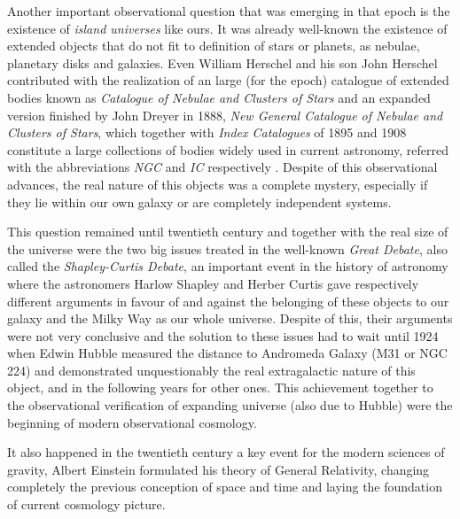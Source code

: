 Another important observational question that was emerging in that epoch 
is the existence of \textit{island universes} like ours. It was already 
well-known the existence of extended objects that do not fit to definition 
of stars or planets, as nebulae, planetary disks and galaxies. Even William
Herschel and his son John Herschel contributed with the realization of an
large (for the epoch) catalogue of extended bodies known as 
\textit{Catalogue of Nebulae and Clusters of Stars} and an expanded version
finished by John Dreyer in 1888, \textit{New General Catalogue of 
Nebulae and Clusters of Stars}, which together with \textit{Index Catalogues}
of 1895 and 1908 constitute a large collections of bodies widely used in 
current astronomy, referred with the abbreviations \textit{NGC} and 
\textit{IC} respectively \cite{longair2008}. Despite of this observational
advances, the real nature of this objects was a complete mystery, especially 
if they lie within our own galaxy or are completely independent systems. 



This question remained until twentieth century and together with the real 
size of the universe were the two big issues treated in the well-known 
\textit{Great Debate}, also called the \textit{Shapley-Curtis Debate}, an
important event in the history of astronomy where the astronomers Harlow 
Shapley and Herber Curtis gave respectively different arguments in favour 
of and against the belonging of these objects to our galaxy and the Milky 
Way as our whole universe. Despite of this, their arguments were not very
conclusive and the solution to these issues had to wait until 1924 when 
Edwin Hubble measured the distance to Andromeda Galaxy (M31 or NGC 224)
and demonstrated unquestionably the real extragalactic nature of this 
object, and in the following years for other ones. This achievement together
to the observational verification of expanding universe (also due to Hubble)
were the beginning of modern observational cosmology.



It also happened in the twentieth century a key event for the modern 
sciences of gravity, Albert Einstein formulated his theory of General 
Relativity, changing completely the previous conception of space and time 
and laying the foundation of current cosmology picture.






